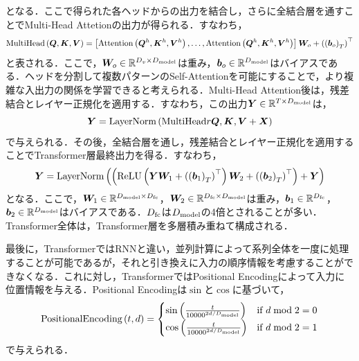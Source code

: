 となる．ここで得られた各ヘッドからの出力を結合し，さらに全結合層を通すことでMulti-Head Attetionの出力が得られる．すなわち，
\begin{equation}
    \text{MultiHead}\left(\bm{Q}, \bm{K}, \bm{V}\right) = \left[\text{Attention}\left(\bm{Q}^{h}, \bm{K}^{h}, \bm{V}^{h}\right), \ldots, \text{Attention}\left(\bm{Q}^{h}, \bm{K}^{h}, \bm{V}^{h}\right)\right] \bm{W}_{o} + \left(\left(\bm{b}_{o}\right)_{T}\right)^\top
\end{equation}
と表される．ここで，$\bm{W}_{o} \in \mathbb{R}^{D_{v} \times D_{\text{model}}}$は重み，$\bm{b}_{o} \in \mathbb{R}^{D_{\text{model}}}$はバイアスである．ヘッドを分割して複数パターンのSelf-Attentionを可能にすることで，より複雑な入出力の関係を学習できると考えられる．Multi-Head Attention後は，残差結合とレイヤー正規化を適用する．すなわち，この出力$\bm{Y} \in \mathbb{R}^{T \times D_{\text{model}}}$は，
\begin{equation}
    \bm{Y} = \text{LayerNorm}\left(\text{MultiHead}r{\bm{Q}, \bm{K}, \bm{V}} + \bm{X}\right)
\end{equation}
で与えられる．その後，全結合層を通し，残差結合とレイヤー正規化を適用することでTransformer層最終出力を得る．すなわち，
\begin{equation}
    \bm{Y} = \text{LayerNorm}\left(\left(\text{ReLU}\left(\bm{Y}\bm{W}_{1} + \left(\left(\bm{b}_{1}\right)_{T}\right)^\top\right)\bm{W}_{2} + \left(\left(\bm{b}_{2}\right)_{T}\right)^\top\right) + \bm{Y}\right)
\end{equation}
となる．ここで，$\bm{W}_{1} \in \mathbb{R}^{D_{\text{model}} \times D_{\text{fc}}}$，$\bm{W}_{2} \in \mathbb{R}^{D_{\text{fc}} \times D_{\text{model}}}$は重み，$\bm{b}_{1} \in \mathbb{R}^{D_{\text{fc}}}$，$\bm{b}_{2} \in \mathbb{R}^{D_{\text{model}}}$はバイアスである．$D_{\text{fc}}$は$D_{\text{model}}$の4倍とされることが多い．Transformer全体は，Transformer層を多層積み重ねて構成される．

最後に，TransformerではRNNと違い，並列計算によって系列全体を一度に処理することが可能であるが，それと引き換えに入力の順序情報を考慮することができなくなる．これに対し，TransformerではPositional Encodingによって入力に位置情報を与える．Positional Encodingは$\sin$と$\cos$に基づいて，
\begin{equation}
    \text{PositionalEncoding}\left(t, d\right) =
    \begin{cases}
        \sin \left(\frac{t}{10000^{2d / D_{\text{model}}}}\right) & \text{if $d \bmod 2 = 0$} \\
        \cos \left(\frac{t}{10000^{2d / D_{\text{model}}}}\right) & \text{if $d \bmod 2 = 1$}
    \end{cases}
\end{equation}
で与えられる．

